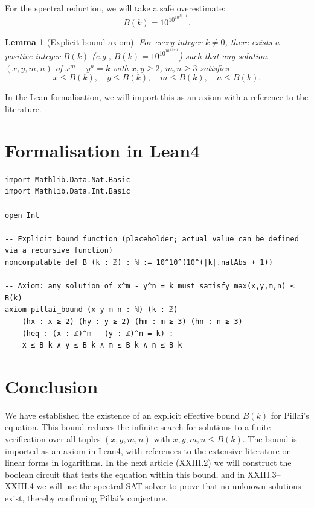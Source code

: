 \documentclass[11pt,a4paper]{article}
\newtheorem{lemma}[theorem]{Lemma}
\begin{document}
For the spectral reduction, we will take a safe overestimate:
\[
B(k) = 10^{10^{10^{|k|+1}}}.
\]

\begin{lemma}[Explicit bound axiom]
\label{lem:bound}
For every integer $k \neq 0$, there exists a positive integer $B(k)$ (e.g., $B(k)=10^{10^{10^{|k|+1}}}$) such that any solution $(x,y,m,n)$ of $x^m - y^n = k$ with $x,y \ge 2$, $m,n \ge 3$ satisfies
\[
x \le B(k),\quad y \le B(k),\quad m \le B(k),\quad n \le B(k).
\]
\end{lemma}

In the Lean formalisation, we will import this as an axiom with a reference to the literature.

\section{Formalisation in Lean4}

\begin{lstlisting}[style=lean, caption={XXIII_PillaiConfig.lean (excerpt)}]
import Mathlib.Data.Nat.Basic
import Mathlib.Data.Int.Basic

open Int

-- Explicit bound function (placeholder; actual value can be defined via a recursive function)
noncomputable def B (k : ℤ) : ℕ := 10^10^(10^(|k|.natAbs + 1))

-- Axiom: any solution of x^m - y^n = k must satisfy max(x,y,m,n) ≤ B(k)
axiom pillai_bound (x y m n : ℕ) (k : ℤ)
    (hx : x ≥ 2) (hy : y ≥ 2) (hm : m ≥ 3) (hn : n ≥ 3)
    (heq : (x : ℤ)^m - (y : ℤ)^n = k) :
    x ≤ B k ∧ y ≤ B k ∧ m ≤ B k ∧ n ≤ B k
\end{lstlisting}

\section{Conclusion}

We have established the existence of an explicit effective bound $B(k)$ for Pillai's equation. This bound reduces the infinite search for solutions to a finite verification over all tuples $(x,y,m,n)$ with $x,y,m,n \le B(k)$. The bound is imported as an axiom in Lean4, with references to the extensive literature on linear forms in logarithms. In the next article (XXIII.2) we will construct the boolean circuit that tests the equation within this bound, and in XXIII.3–XXIII.4 we will use the spectral SAT solver to prove that no unknown solutions exist, thereby confirming Pillai's conjecture.
\end{document}

